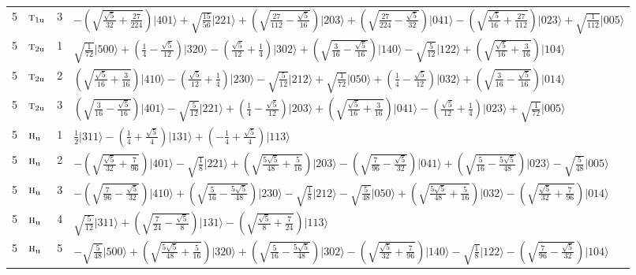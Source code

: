 \documentclass[11pt]{article}
\newcommand{\irr}[1]{\text{\normalfont\scshape #1}}
\newcommand{\ptag}[1]{\mathrm{#1}}
\newcommand{\occ}[1]{\lvert #1\rangle}
\begin{document}
\begin{longtable}{c l c p{}}
5 & $\irr{t}_{1\ptag{u}}$ & 3 & $-(\sqrt{\frac{\sqrt{5}}{32} + \frac{27}{224}})\occ{401}+\sqrt{\tfrac{15}{56}}\occ{221}+(\sqrt{\frac{27}{112} - \frac{\sqrt{5}}{16}})\occ{203}+(\sqrt{\frac{27}{224} - \frac{\sqrt{5}}{32}})\occ{041}-(\sqrt{\frac{\sqrt{5}}{16} + \frac{27}{112}})\occ{023}+\sqrt{\tfrac{1}{112}}\occ{005}$\\
5 & $\irr{t}_{2\ptag{u}}$ & 1 & $\sqrt{\tfrac{1}{72}}\occ{500}+(\frac{1}{4} - \frac{\sqrt{5}}{12})\occ{320}-(\frac{\sqrt{5}}{12} + \frac{1}{4})\occ{302}+(\sqrt{\frac{3}{16} - \frac{\sqrt{5}}{16}})\occ{140}-\sqrt{\tfrac{5}{12}}\occ{122}+(\sqrt{\frac{\sqrt{5}}{16} + \frac{3}{16}})\occ{104}$\\
5 & $\irr{t}_{2\ptag{u}}$ & 2 & $(\sqrt{\frac{\sqrt{5}}{16} + \frac{3}{16}})\occ{410}-(\frac{\sqrt{5}}{12} + \frac{1}{4})\occ{230}-\sqrt{\tfrac{5}{12}}\occ{212}+\sqrt{\tfrac{1}{72}}\occ{050}+(\frac{1}{4} - \frac{\sqrt{5}}{12})\occ{032}+(\sqrt{\frac{3}{16} - \frac{\sqrt{5}}{16}})\occ{014}$\\
5 & $\irr{t}_{2\ptag{u}}$ & 3 & $(\sqrt{\frac{3}{16} - \frac{\sqrt{5}}{16}})\occ{401}-\sqrt{\tfrac{5}{12}}\occ{221}+(\frac{1}{4} - \frac{\sqrt{5}}{12})\occ{203}+(\sqrt{\frac{\sqrt{5}}{16} + \frac{3}{16}})\occ{041}-(\frac{\sqrt{5}}{12} + \frac{1}{4})\occ{023}+\sqrt{\tfrac{1}{72}}\occ{005}$\\
5 & $\irr{h}_{\ptag{u}}$ & 1 & $\tfrac{1}{2}\occ{311}-(\frac{1}{4} + \frac{\sqrt{5}}{4})\occ{131}+(- \frac{1}{4} + \frac{\sqrt{5}}{4})\occ{113}$\\
5 & $\irr{h}_{\ptag{u}}$ & 2 & $-(\sqrt{\frac{\sqrt{5}}{32} + \frac{7}{96}})\occ{401}-\sqrt{\tfrac{1}{8}}\occ{221}+(\sqrt{\frac{5 \sqrt{5}}{48} + \frac{5}{16}})\occ{203}-(\sqrt{\frac{7}{96} - \frac{\sqrt{5}}{32}})\occ{041}+(\sqrt{\frac{5}{16} - \frac{5 \sqrt{5}}{48}})\occ{023}-\sqrt{\tfrac{5}{48}}\occ{005}$\\
5 & $\irr{h}_{\ptag{u}}$ & 3 & $-(\sqrt{\frac{7}{96} - \frac{\sqrt{5}}{32}})\occ{410}+(\sqrt{\frac{5}{16} - \frac{5 \sqrt{5}}{48}})\occ{230}-\sqrt{\tfrac{1}{8}}\occ{212}-\sqrt{\tfrac{5}{48}}\occ{050}+(\sqrt{\frac{5 \sqrt{5}}{48} + \frac{5}{16}})\occ{032}-(\sqrt{\frac{\sqrt{5}}{32} + \frac{7}{96}})\occ{014}$\\
5 & $\irr{h}_{\ptag{u}}$ & 4 & $\sqrt{\tfrac{5}{12}}\occ{311}+(\sqrt{\frac{7}{24} - \frac{\sqrt{5}}{8}})\occ{131}-(\sqrt{\frac{\sqrt{5}}{8} + \frac{7}{24}})\occ{113}$\\
5 & $\irr{h}_{\ptag{u}}$ & 5 & $-\sqrt{\tfrac{5}{48}}\occ{500}+(\sqrt{\frac{5 \sqrt{5}}{48} + \frac{5}{16}})\occ{320}+(\sqrt{\frac{5}{16} - \frac{5 \sqrt{5}}{48}})\occ{302}-(\sqrt{\frac{\sqrt{5}}{32} + \frac{7}{96}})\occ{140}-\sqrt{\tfrac{1}{8}}\occ{122}-(\sqrt{\frac{7}{96} - \frac{\sqrt{5}}{32}})\occ{104}$\\

\end{longtable}
\end{document}
